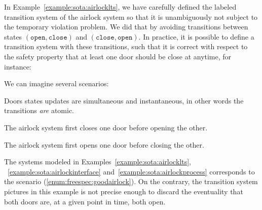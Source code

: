 \documentclass[oneside,a4paper]{memoir}
\theoremstyle{break}
\begin{document}
\begin{example}
  In Example~\ref{example:sota:airlocklts}, we have carefully defined the
  labeled transition system of the airlock system so that it is unambiguously
  not subject to the temporary violation problem.
  We did that by avoiding transitions between states
  \( (\mathtt{open}, \mathtt{close}) \) and
  \( (\mathtt{close}, \mathtt{open}) \).
  In practice, it is possible to define a transition system with these
  transitions, such that it is correct with respect to the safety property that
  at least one door should be close at anytime, for instance:

  \begin{center}
  \end{center}

  We can imagine several scenarios:
  \begin{inparaenum}[(1)]
  \item Doors states updates are simultaneous and instantaneous, in other words
    the transitions \emph{are} atomic.
  \item The airlock system first closes one door before opening the
    other. \label{enum:freespec:goodairlock}
  \item The airlock system first opens one door before closing the
    other. \label{enum:freespec:badairlock}
  \end{inparaenum}
  The systems modeled in Examples~\ref{example:sota:airlocklts},
  ~\ref{example:sota:airlockinterface} and~\ref{example:sota:airlockprocess}
  corresponds to the scenario (\ref{enum:freespec:goodairlock}).
  On the contrary, the transition system pictures in this example is not precise
  enough to discard the eventuality that both doors are, at a given point in
  time, both open.
\end{example}
\end{document}
